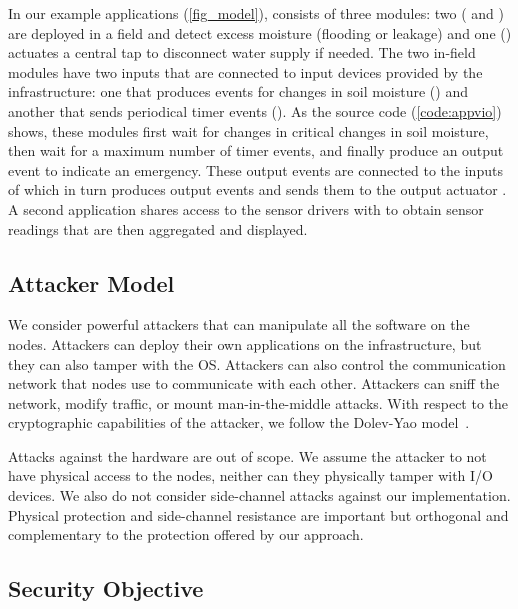 In our example applications (\cref{fig_model}), \appvio{} consists of three
modules: two ( and ) are deployed
in a field and detect excess moisture (flooding or leakage) and one
() actuates a central tap to disconnect water supply if
needed. The two in-field modules have two inputs that are connected to input
devices provided by the infrastructure: one that produces events for changes in
soil moisture () and another that sends periodical timer events
(). As the source code (\cref{code:appvio}) shows, these modules first
wait for changes in critical changes in soil moisture, then wait for a maximum
number of timer events, and finally produce an output event to indicate an
emergency. These output events are connected to the inputs of
 which in turn produces output events  and sends them to
the output actuator . A second application \appavl{} shares access to the
sensor drivers with \appvio{} to obtain sensor readings that are then aggregated
and displayed.

\subsection{Attacker Model}
\label{concept:attacker}
%
We consider powerful attackers that can manipulate all the software on the
nodes. Attackers can deploy their own applications on the infrastructure, but
they can also tamper with the OS. Attackers can also control the communication
network that nodes use to communicate with each other. Attackers can sniff the
network, modify traffic, or mount man-in-the-middle attacks. With respect to the
cryptographic capabilities of the attacker, we follow the Dolev-Yao
model~\cite{dolev-yao}.

Attacks against the hardware are out of
scope. We assume the attacker to not have
physical access to the nodes, neither can they physically tamper with I/O
devices. We also do not consider side-channel attacks against our
implementation. Physical protection and side-channel resistance are important
but orthogonal and complementary to the protection offered by our approach.

\subsection{Security Objective}
\label{concept:goals}
\label{concept:deployer-tcb}

